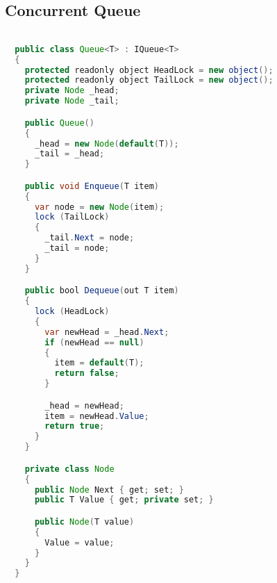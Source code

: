 \subsection{Concurrent Queue}
\begin{lstlisting}[label=lst:impl_queue_lock,
  caption={Lock based Concurrent Queue Implementation},
  language=Java,  
  showspaces=false,
  showtabs=false,
  breaklines=true,
  showstringspaces=false,
  breakatwhitespace=true,
  commentstyle=\color{greencomments},
  keywordstyle=\color{bluekeywords},
  stringstyle=\color{redstrings},
  escapechar=~,
  morekeywords={atomic, retry, orelse, var, get, set, ref, out, readonly, virtual, override}]  % Start your code-block

  public class Queue<T> : IQueue<T>
  {
    protected readonly object HeadLock = new object();
    protected readonly object TailLock = new object();
    private Node _head;
    private Node _tail;

    public Queue()
    {
      _head = new Node(default(T));
      _tail = _head;
    }

    public void Enqueue(T item)
    {
      var node = new Node(item);
      lock (TailLock)
      {
        _tail.Next = node;
        _tail = node;
      }
    }

    public bool Dequeue(out T item)
    {
      lock (HeadLock)
      {
        var newHead = _head.Next;
        if (newHead == null)
        {
          item = default(T);
          return false;
        }

        _head = newHead;
        item = newHead.Value;
        return true;
      }
    }

    private class Node
    {
      public Node Next { get; set; }
      public T Value { get; private set; }

      public Node(T value)
      {
        Value = value;
      }
    }
  }

\end{lstlisting}

